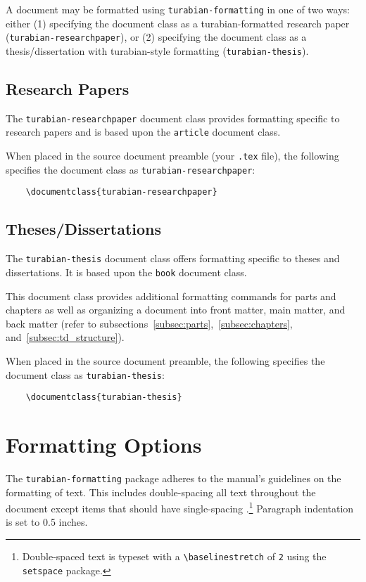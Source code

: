 \documentclass{article}
\newcommand{\textcmd}[1]{\texttt{\textbackslash #1}}
\begin{document}
A document may be formatted using \texttt{turabian-formatting} in one of two ways: either (1) specifying the document class as a turabian-formatted research paper (\texttt{turabian-researchpaper}), or (2) specifying the document class as a thesis/dissertation with turabian-style formatting (\texttt{turabian-thesis}).


\subsection{Research Papers}

%
The \texttt{turabian-researchpaper} document class provides formatting specific to research papers and is based upon the \texttt{article} document class.

When placed in the source document preamble (your \texttt{.tex} file), the following specifies the document class as \texttt{turabian-researchpaper}:
\begin{lstlisting}
	\documentclass{turabian-researchpaper}
\end{lstlisting}


\subsection{Theses/Dissertations}

%
The \texttt{turabian-thesis} document class offers formatting specific to theses and dissertations. It is based upon the \texttt{book} document class. 

This document class provides additional formatting commands for parts and chapters as well as organizing a document into front matter, main matter, and back matter (refer to subsections~\ref{subsec:parts},~\ref{subsec:chapters}, and~\ref{subsec:td_structure}).

When placed in the source document preamble, the following specifies the document class as \texttt{turabian-thesis}:
\begin{lstlisting}
	\documentclass{turabian-thesis}
\end{lstlisting}


\clearpage
\section{Formatting Options}
\label{sec:formatting_options}


The \texttt{turabian-formatting} package adheres to the manual's guidelines on the formatting of text. This includes double-spacing all text throughout the document except items that should have single-spacing \autocite[373]{turabian_manual_2013}.\footnote{%
	Double-spaced text is typeset with a \textcmd{baselinestretch} of \texttt{2} using the \texttt{setspace} package.}
Paragraph indentation is set to 0.5 inches.
\end{document}
